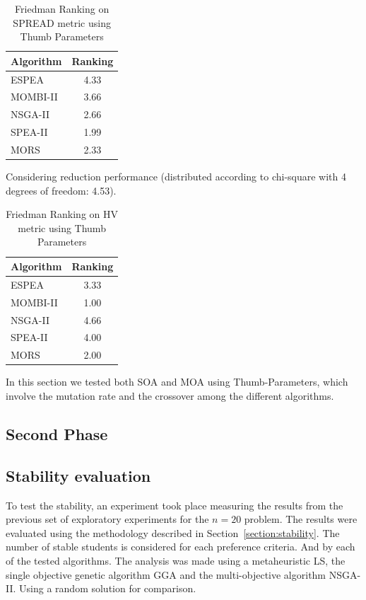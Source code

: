 \begin{table}[!htc]
\centering
\begin{tabular}{lc}
\toprule
Algorithm&Ranking\\
\midrule
ESPEA&4.33\\
MOMBI-II&3.66\\
NSGA-II&2.66\\
SPEA-II&1.99\\
MORS&2.33\\
\bottomrule
\end{tabular}
\caption{Friedman Ranking on SPREAD metric using Thumb Parameters}
\label{tab:fried_spread_thumb}
Considering reduction performance (distributed according to chi-square with 4 degrees of freedom: 4.53).
\end{table}

\begin{table}[!htc]
\centering
\begin{tabular}{lc}
\toprule
Algorithm&Ranking\\
\midrule
ESPEA&3.33\\
MOMBI-II&1.00\\
NSGA-II&4.66\\
SPEA-II&4.00\\
MORS&2.00\\
\bottomrule
\end{tabular}
\caption{Friedman Ranking on HV metric using Thumb Parameters}
\label{tab:fried_hv_thumb}
\end{table}


In this section we tested both SOA and MOA using Thumb-Parameters, which involve the mutation rate and the crossover among the different algorithms.

\subsection{Second Phase}
\label{sec:second-phase}


\subsection{Stability evaluation}

To test the stability, an experiment took place measuring the results from the previous set of exploratory experiments for the $n=20$ problem. The results were evaluated using the methodology described in Section~\ref{section:stability}. The number of stable students is considered for each preference criteria. And by each of the tested algorithms. The analysis was made using a metaheuristic LS, the single objective genetic algorithm GGA and the multi-objective algorithm NSGA-II. Using a random solution for comparison.\\

